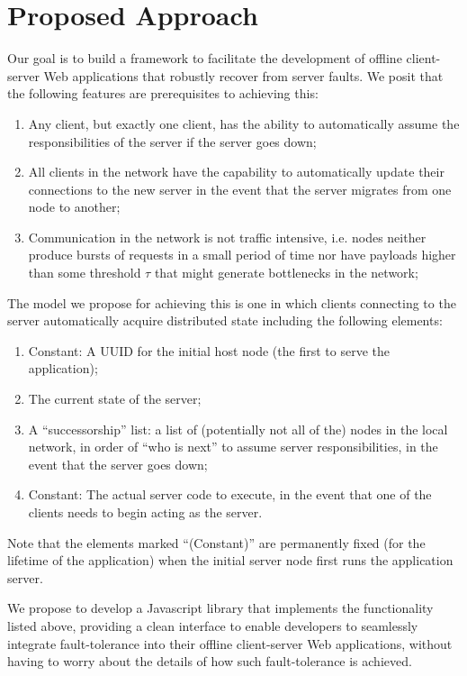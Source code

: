 \section{Proposed Approach}
\label{sec:approach}

Our goal is to build a framework to facilitate the development of offline client-server Web applications that robustly recover from server faults. 
We posit that the following features are prerequisites to achieving this:

\begin{enumerate}
    \item Any client, but exactly one client, has the ability to automatically assume the responsibilities of the server if the server goes down;
    \item All clients in the network have the capability to automatically update their connections to the new server in the event that the server migrates from one node to another;
    \item Communication in the network is not traffic intensive, i.e. nodes neither produce bursts of requests in a small period of time nor have payloads higher than some threshold $\tau$ that might generate bottlenecks in the network;
    
\end{enumerate}

The model we propose for achieving this is one in which clients connecting to the server automatically acquire distributed state including the following elements:

\begin{enumerate}
	\item Constant: A UUID for the initial host node (the first to serve the application);
    \item The current state of the server;
	\item A ``successorship'' list: a list of (potentially not all of the) nodes in the local network, in order of ``who is next'' to assume server responsibilities, in the event that the server goes down;
    \item Constant: The actual server code to execute, in the event that one of the clients needs to begin acting as the server.
\end{enumerate}

Note that the elements marked ``(Constant)'' are permanently fixed (for the lifetime of the application) when the initial server node first runs the application server.

We propose to develop a Javascript library that implements the functionality listed above, providing a clean interface to enable developers to seamlessly integrate fault-tolerance into their offline client-server Web applications, without having to worry about the details of how such fault-tolerance is achieved.







